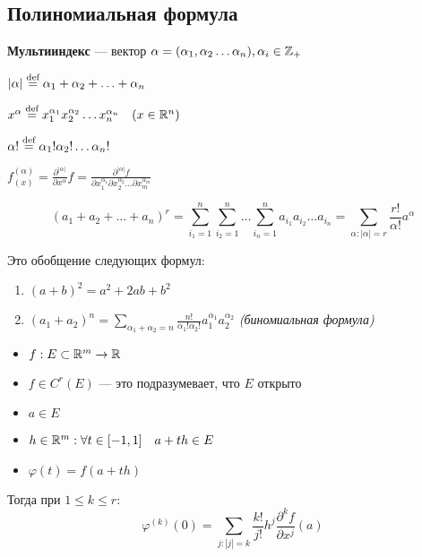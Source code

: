 

\cfoot{}



\subsection*{Полиномиальная формула}

\begin{definition}
    \textbf{Мультииндекс} --- вектор $\alpha = (\alpha_1, \alpha_2\ldots \alpha_n), \alpha_i\in\mathbb{Z}_+$

    $|\alpha| \stackrel{\text{def}}{=} \alpha_1+\alpha_2+\ldots+\alpha_n$

    $x^\alpha \stackrel{\text{def}}{=} x_1^{\alpha_1}x_2^{\alpha_2}\ldots x_n^{\alpha_n} \quad (x\in\mathbb{R}^n)$

    $\alpha! \stackrel{\text{def}}{=} \alpha_1!\alpha_2!\ldots\alpha_n!$

    $f^{(\alpha)}_{(x)}=\frac{\partial^{|\alpha|}}{\partial x^\alpha} f = \frac{\partial^{|\alpha|}f}{\partial x_1^{\alpha_1}\partial x_2^{\alpha_2}\ldots \partial x_m^{\alpha_m}}$
\end{definition}

$$(a_1+a_2+\ldots+a_n)^r=\sum_{i_1=1}^n\sum_{i_2=1}^n\ldots \sum_{i_n=1}^n a_{i_1}a_{i_2}\ldots a_{i_n}=\sum_{\alpha : |\alpha| = r} \frac{r!}{\alpha!} a^\alpha$$

Это обобщение следующих формул:
\begin{enumerate}
    \item $(a+b)^2 = a^2 + 2ab + b^2$
    \item $(a_1+a_2)^n = \sum\limits_{\alpha_1+\alpha_2=n}\frac{n!}{\alpha_1!\alpha_2!} a_1^{\alpha_1}a_2^{\alpha_2}$ \textit{(биномиальная формула)}
\end{enumerate}

\begin{lemma}
    \itemfix
    \begin{itemize}
        \item $f: E\subset \mathbb{R}^m \to\mathbb{R}$
        \item $f\in C^r(E)$ --- это подразумевает, что $E$ открыто
        \item $a\in E$
        \item $h\in \mathbb{R}^m : \forall t\in[-1, 1] \quad a+th\in E$
        \item $\varphi(t) = f(a+th)$
    \end{itemize}
    Тогда при $1\le k\le r$:
    $$\varphi^{(k)}(0)=\sum_{j : |j|=k} \frac{k!}{j!} h^j \frac{\partial^k f}{\partial x^j} (a)$$
\end{lemma}

